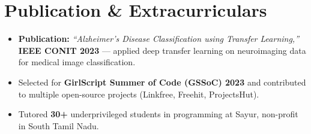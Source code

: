 \documentclass[letterpaper,10pt]{article}
\begin{document}
\section{Publication \& Extracurriculars}
\begin{itemize}[leftmargin=0.18in, itemsep=0pt, topsep=1pt]
  \item\small \textbf{Publication:} \textit{``Alzheimer's Disease Classification using Transfer Learning,''} \textbf{IEEE CONIT 2023} --- applied deep transfer learning on neuroimaging data for medical image classification.
  \item\small Selected for \textbf{GirlScript Summer of Code (GSSoC) 2023} and contributed to multiple open-source projects (Linkfree, Freehit, ProjectsHut).
  \item\small Tutored \textbf{30+} underprivileged students in programming at Sayur, non-profit in South Tamil Nadu.
\end{itemize}
\vspace{-6pt}
\end{document}
